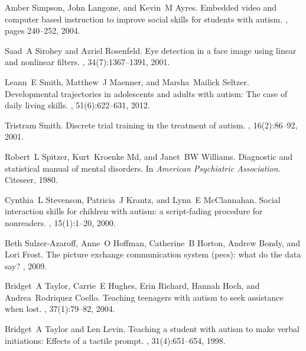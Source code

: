 \documentclass{ut-thesis}
\begin{document}
\begin{thebibliography}{100}
Amber Simpson, John Langone, and Kevin~M Ayres.
\newblock Embedded video and computer based instruction to improve social
  skills for students with autism.
, pages
  240--252, 2004.

Saad~A Sirohey and Azriel Rosenfeld.
\newblock Eye detection in a face image using linear and nonlinear filters.
, 34(7):1367--1391, 2001.

Leann~E Smith, Matthew~J Maenner, and Marsha~Mailick Seltzer.
\newblock Developmental trajectories in adolescents and adults with autism: The
  case of daily living skills.
, 51(6):622--631, 2012.

Tristram Smith.
\newblock Discrete trial training in the treatment of autism.
,
  16(2):86--92, 2001.

Robert~L Spitzer, Kurt~Kroenke Md, and Janet~BW Williams.
\newblock Diagnostic and statistical manual of mental disorders.
\newblock In {\em American Psychiatric Association}. Citeseer, 1980.

Cynthia~L Stevenson, Patricia~J Krantz, and Lynn~E McClannahan.
\newblock Social interaction skills for children with autism: a script-fading
  procedure for nonreaders.
, 15(1):1--20, 2000.

Beth Sulzer-Azaroff, Anne~O Hoffman, Catherine~B Horton, Andrew Bondy, and Lori
  Frost.
\newblock The picture exchange communication system (pecs): what do the data
  say?
, 2009.

Bridget~A Taylor, Carrie~E Hughes, Erin Richard, Hannah Hoch, and
  Andrea~Rodriquez Coello.
\newblock Teaching teenagers with autism to seek assistance when lost.
, 37(1):79--82, 2004.

Bridget~A Taylor and Len Levin.
\newblock Teaching a student with autism to make verbal initiations: Effects of
  a tactile prompt.
, 31(4):651--654, 1998.


\end{thebibliography}
\end{document}
